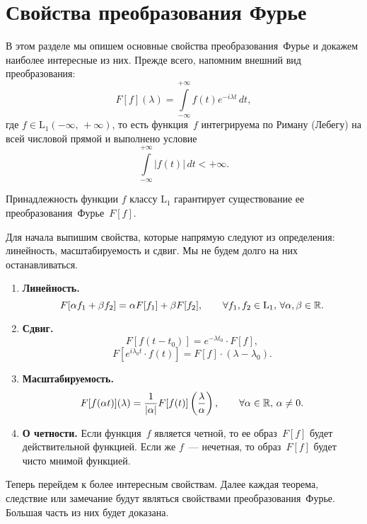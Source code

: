 \section{Свойства преобразования Фурье}

В этом разделе мы опишем основные свойства преобразования~Фурье и докажем наиболее интересные из них.
Прежде всего, напомним внешний вид преобразования:
$$
        F[f] (\lambda) = \int\limits_{-\infty}^{+\infty}f(t)e^{-i\lambda t}\, dt,
$$
где $f \in \mbox{L}_1(-\infty,\,+\infty)$, то есть функция~$f$ интегрируема по Риману (Лебегу) на всей числовой прямой и выполнено условие
$$
        \int\limits_{-\infty}^{+\infty}|f(t)|\,dt < +\infty. 
$$

\begin{remark}
        Принадлежность функции $f$ классу $\mbox{L}_1$ гарантирует существование ее преобразования~Фурье~$F[f]$.
\end{remark}

Для начала выпишим свойства, которые напрямую следуют из определения: линейность, масштабируемость и сдвиг. Мы не будем долго на них останавливаться.
\begin{enumerate}
        \item \textbf{Линейность.}
$$
        F[\alpha f_1 + \beta f_2]
=
        \alpha F[f_1] + \beta F[f_2],
\qquad
        \forall f_1,f_2 \in \mbox{L}_1,\,\forall \alpha,\beta \in \mathbb{R}.
$$
        \item \textbf{Сдвиг.}
$$
        F[f(t - t_0)] = e^{-\lambda t_0}\cdot F[f],
$$
$$
        F[e^{i\lambda_0 t}\cdot f(t)] = F[f]\cdot(\lambda - \lambda_0).
$$
        \item \textbf{Масштабируемость.}
$$
        F[f(\alpha t)](\lambda) = \frac{1}{|\alpha|}F[f(t)]\left(\frac{\lambda}{\alpha}\right),
\qquad
        \forall \alpha \in \mathbb{R},\,\alpha \neq 0.
$$
        \item \textbf{О четности.} Если функция~$f$ является четной, то ее образ~$F[f]$ будет действительной функцией. Если же $f$~--- нечетная, то образ~$F[f]$ будет чисто мнимой функцией.
\end{enumerate}

Теперь перейдем к более интересным свойствам. Далее каждая теорема, следствие или замечание будут являться свойствами преобразования~Фурье. Большая часть из них будет доказана.

